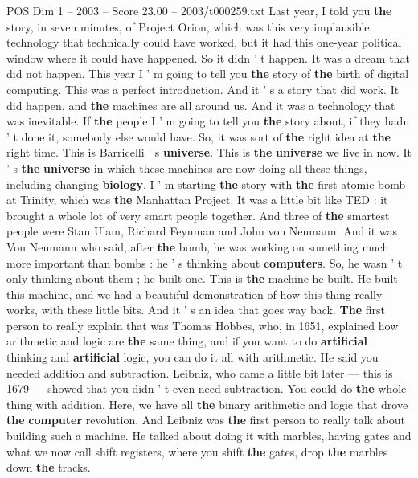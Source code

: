 \begin{textsample}{POS Dim 1 – 2003 – Score 23.00 – 2003/t000259.txt}  \label{ex:f1_pos_003}
Last year, I told you \textbf{the} story, in seven minutes, of Project Orion, which was this very implausible technology that technically could have worked, but it had this one-year political window where it could have happened.
So it didn ' t happen.
It was a dream that did not happen.
This year I ' m going to tell you \textbf{the} story of \textbf{the} birth of digital computing.
This was a perfect introduction.
And it ' s a story that did work.
It did happen, and \textbf{the} machines are all around us.
And it was a technology that was inevitable.
If \textbf{the} people I ' m going to tell you \textbf{the} story about, if they hadn ' t done it, somebody else would have.
So, it was sort of \textbf{the} right idea at \textbf{the} right time.
This is Barricelli ' s \textbf{universe}.
This is \textbf{the} \textbf{universe} we live in now.
It ' s \textbf{the} \textbf{universe} in which these machines are now doing all these things, including changing \textbf{biology}.
I ' m starting \textbf{the} story with \textbf{the} first atomic bomb at Trinity, which was \textbf{the} Manhattan Project.
It was a little bit like TED : it brought a whole lot of very smart people together.
And three of \textbf{the} smartest people were Stan Ulam, Richard Feynman and John von Neumann.
And it was Von Neumann who said, after \textbf{the} bomb, he was working on something much more important than bombs : he ' s thinking about \textbf{computers}.
So, he wasn ' t only thinking about them ; he built one.
This is \textbf{the} machine he built.
He built this machine, and we had a beautiful demonstration of how this thing really works, with these little bits.
And it ' s an idea that goes way back. \textbf{The} first person to really explain that was Thomas Hobbes, who, in 1651, explained how arithmetic and logic are \textbf{the} same thing, and if you want to do \textbf{artificial} thinking and \textbf{artificial} logic, you can do it all with arithmetic.
He said you needed addition and subtraction.
Leibniz, who came a little bit later — this is 1679 — showed that you didn ' t even need subtraction.
You could do \textbf{the} whole thing with addition.
Here, we have all \textbf{the} binary arithmetic and logic that drove \textbf{the} \textbf{computer} revolution.
And Leibniz was \textbf{the} first person to really talk about building such a machine.
He talked about doing it with marbles, having gates and what we now call shift registers, where you shift \textbf{the} gates, drop \textbf{the} marbles down \textbf{the} tracks.

\end{textsample}
